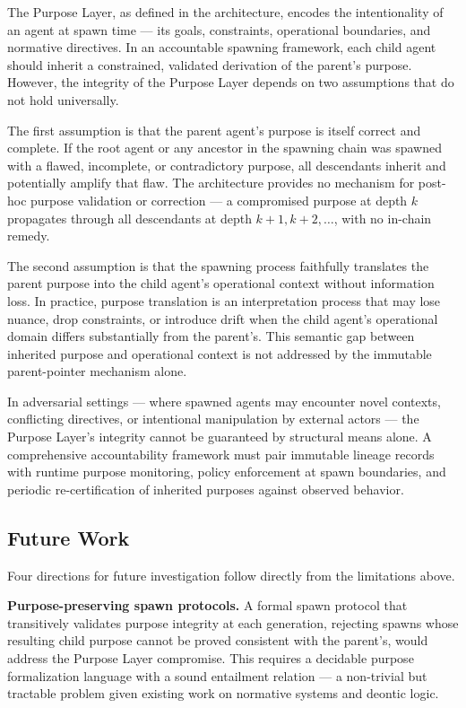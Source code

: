 The Purpose Layer, as defined in the architecture, encodes the
intentionality of an agent at spawn time — its goals, constraints,
operational boundaries, and normative directives. In an accountable
spawning framework, each child agent should inherit a constrained,
validated derivation of the parent's purpose. However, the integrity of
the Purpose Layer depends on two assumptions that do not hold
universally.

The first assumption is that the parent agent's purpose is itself
correct and complete. If the root agent or any ancestor in the spawning
chain was spawned with a flawed, incomplete, or contradictory purpose,
all descendants inherit and potentially amplify that flaw. The
architecture provides no mechanism for post-hoc purpose validation or
correction — a compromised purpose at depth $k$ propagates through all
descendants at depth $k + 1, k + 2, \ldots$, with no in-chain remedy.

The second assumption is that the spawning process faithfully translates
the parent purpose into the child agent's operational context without
information loss. In practice, purpose translation is an interpretation
process that may lose nuance, drop constraints, or introduce drift when
the child agent's operational domain differs substantially from the
parent's. This semantic gap between inherited purpose and operational
context is not addressed by the immutable parent-pointer mechanism alone.

In adversarial settings — where spawned agents may encounter novel
contexts, conflicting directives, or intentional manipulation by
external actors — the Purpose Layer's integrity cannot be guaranteed by
structural means alone. A comprehensive accountability framework must
pair immutable lineage records with runtime purpose monitoring, policy
enforcement at spawn boundaries, and periodic re-certification of
inherited purposes against observed behavior.

\subsection{Future Work}

Four directions for future investigation follow directly from the
limitations above.

\textbf{Purpose-preserving spawn protocols.} A formal spawn protocol
that transitively validates purpose integrity at each generation,
rejecting spawns whose resulting child purpose cannot be proved
consistent with the parent's, would address the Purpose Layer
compromise. This requires a decidable purpose formalization language
with a sound entailment relation — a non-trivial but tractable problem
given existing work on normative systems and deontic logic.


